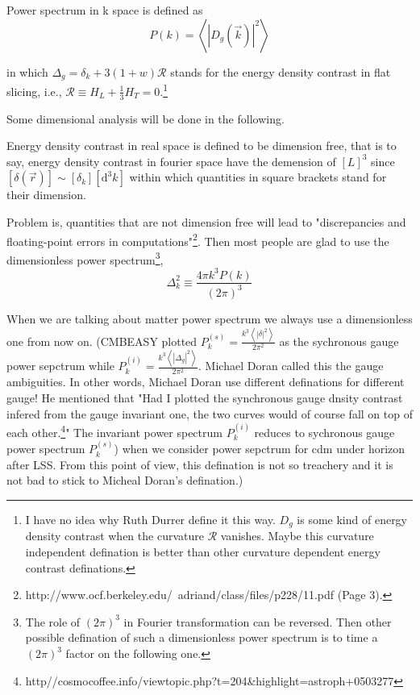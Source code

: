 \documentclass{article}
\begin{document}
\begin{defination}
Power spectrum in k space is defined as \\
$$P(k)=\left<\left|D_g(\vec k)\right|^2\right>$$
\end{defination}
in which $\Delta_g=\delta_k+3(1+w)\mathcal R$ stands for the energy density contrast in flat slicing, i.e., $\mathcal R\equiv H_L+\frac 1 3 H_T=0$.{\footnote{I have no idea why Ruth Durrer define it this way. $D_g$ is some kind of energy density contrast when the curvature $\mathcal R$ vanishes. Maybe this curvature independent defination is better than other curvature dependent energy contrast definations.}}

Some dimensional analysis will be done in the following.

Energy density contrast in real space is defined to be dimension free, that is to say, energy density contrast in fourier space have the demension of $[L]^3$ since $[\delta(\vec r)]\sim [\delta_k][\mathrm d^3k]$ within which quantities in square brackets stand for their dimension.

Problem is, quantities that are not dimension free will lead to "discrepancies and floating-point errors in computations"{\footnote{http:\slash\slash www.ocf.berkeley.edu/~adriand/class/files/p228/11.pdf  (Page 3).}}. Then most people are glad to use the dimensionless power spectrum{\footnote{The role of $(2\pi)^3$ in Fourier transformation can be reversed. Then other possible defination of such a dimensionless power spectrum is to time a $(2\pi)^3$ factor on the following one.}},
\begin{equation}
\Delta^2_k\equiv \frac{4\pi k^3 P(k)}{(2\pi)^3}
\end{equation}

When we are talking about matter power spectrum we always use a dimensionless one from now on. {\color{red}(CMBEASY plotted $P^{(s)}_k=\frac{k^3\left<\left|\delta\right|^2\right>}{2\pi^2}$ as the sychronous gauge power sepctrum while $P^{(i)}_k=\frac{k^3\left<\left|\Delta_g\right|^2\right>}{2\pi^2}$. Michael Doran called this the gauge ambiguities. In other words, Michael Doran use different definations for different gauge! He mentioned that "Had I plotted the synchronous gauge dnsity contrast infered from the gauge invariant one, the two curves would of course fall on top of each other.{\footnote{http\slash\slash cosmocoffee.info/viewtopic.php?t=204\&highlight=astroph+0503277}}" The invariant power spectrum $P^{(i)}_k$ reduces to sychronous gauge power spectrum $P^{(s)}_k$) when we consider power sepctrum for cdm under horizon after LSS. From this point of view, this defination is not so treachery and it is not bad to stick to Micheal Doran's defination.)} 
\end{document}
